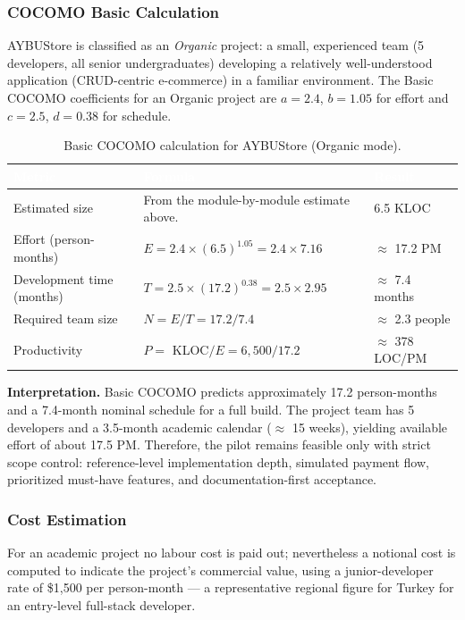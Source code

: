 \documentclass[11pt,a4paper]{article}
\begin{document}
\subsubsection*{COCOMO Basic Calculation}
AYBUStore is classified as an \emph{Organic} project: a small,
experienced team (5 developers, all senior undergraduates) developing
a relatively well-understood application (CRUD-centric e-commerce) in
a familiar environment. The Basic COCOMO coefficients for an Organic
project are $a = 2.4$, $b = 1.05$ for effort and $c = 2.5$, $d = 0.38$
for schedule.
 
\begin{table}[H]
\centering
\small
\begin{tabular}{|p{}|p{}|p{}|}
\hline
\rowcolor{aybuHeader}
\textcolor{white}{\textbf{Metric}} &
\textcolor{white}{\textbf{Formula}} &
\textcolor{white}{\textbf{Result}} \\ \hline
 
Estimated size & From the module-by-module estimate above. & 6.5 KLOC \\ \hline
Effort (person-months) & $E = 2.4 \times (6.5)^{1.05} = 2.4 \times 7.16$ & $\approx$ 17.2 PM \\ \hline
Development time (months) & $T = 2.5 \times (17.2)^{0.38} = 2.5 \times 2.95$ & $\approx$ 7.4 months \\ \hline
Required team size & $N = E / T = 17.2 / 7.4$ & $\approx$ 2.3 people \\ \hline
Productivity & $P = $ KLOC$ / E = 6{,}500 / 17.2$ & $\approx$ 378 LOC/PM \\ \hline
\end{tabular}
\caption{Basic COCOMO calculation for AYBUStore (Organic mode).}
\label{tab:cocomo}
\end{table}
 
\noindent
\textbf{Interpretation.} Basic COCOMO predicts approximately
17.2 person-months and a 7.4-month nominal schedule for a full build.
The project team has 5 developers and a 3.5-month academic calendar
($\approx$ 15 weeks), yielding available effort of about 17.5 PM.
Therefore, the pilot remains feasible only with strict scope control:
reference-level implementation depth, simulated payment flow,
prioritized must-have features, and documentation-first acceptance.
 
\subsubsection*{Cost Estimation}
For an academic project no labour cost is paid out; nevertheless a
notional cost is computed to indicate the project's commercial value,
using a junior-developer rate of \$1{,}500 per person-month --- a
representative regional figure for Turkey for an entry-level
full-stack developer.
 
\end{document}
